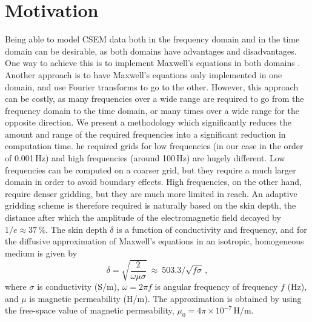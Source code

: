 \documentclass[extra, camera,%
    onecolumn,   %
    referee,     %
]{gji}
\begin{document}
\section{Motivation}  %

Being able to model CSEM data both in the frequency domain and in the time
domain can be desirable, as both domains have advantages and disadvantages. One
way to achieve this is to implement Maxwell's equations in both domains
. Another approach is to have Maxwell's equations
only implemented in one domain, and use Fourier transforms to go to the other.
However, this approach can be costly, as many frequencies over a wide range are
required to go from the frequency domain to the time domain, or many times over
a wide range for the opposite direction. We present a methodology which
significantly reduces the amount and range of the required
frequencies into a significant reduction in computation time. he
required  grids for low frequencies (in our case in the
order of 0.001\,Hz) and high frequencies (around 100\,Hz) are hugely different.
Low frequencies can be computed on a coarser grid, but they require a much
larger domain in order to avoid boundary effects. High frequencies, on the
other hand, require denser gridding, but they are much more limited in reach.
An adaptive gridding scheme is therefore required is naturally based on the skin depth,
 the distance after which the amplitude of the
electromagnetic field  decayed by $1/e\approx 37\,\%$. The
skin depth $\delta$ is a function of conductivity and frequency, and for the
diffusive approximation of Maxwell's equations in an isotropic, homogeneous
medium is given by \citep[e.g.,][\mbox{}]{B.SEG.88.Ward}
%
\begin{equation}
  \delta = \sqrt{\frac{2}{\omega\mu\sigma}}
  \ \approx \ 503.3/\sqrt{f\sigma} \, ,
  \label{eq:skindepth}
\end{equation}
%
where $\sigma$ is conductivity (S/m), $\omega=2\pi f$ is angular frequency of
frequency $f$ (Hz), and $\mu$ is magnetic permeability (H/m). The approximation
is obtained by using the free-space value of magnetic permeability,
$\mu_0=4\pi\times10^{-7}\,$H/m.
\end{document}
